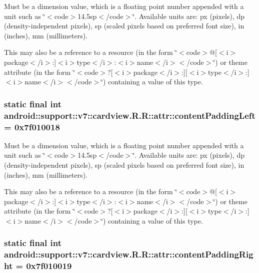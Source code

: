 Must be a dimension value, which is a floating point number appended with a unit such as \char`\"{}$<$code$>$14.5sp$<$/code$>$\char`\"{}. Available units are: px (pixels), dp (density-independent pixels), sp (scaled pixels based on preferred font size), in (inches), mm (millimeters). 

This may also be a reference to a resource (in the form \char`\"{}$<$code$>$@\mbox{[}$<$i$>$package$<$/i$>$:\mbox{]}$<$i$>$type$<$/i$>$:$<$i$>$name$<$/i$>$$<$/code$>$\char`\"{}) or theme attribute (in the form \char`\"{}$<$code$>$?\mbox{[}$<$i$>$package$<$/i$>$:\mbox{]}\mbox{[}$<$i$>$type$<$/i$>$:\mbox{]}$<$i$>$name$<$/i$>$$<$/code$>$\char`\"{}) containing a value of this type. \hypertarget{classandroid_1_1support_1_1v7_1_1cardview_1_1_r_1_1attr_bb0d43620767ddf0f0698491c1278877}{
\subsubsection[{contentPaddingLeft}]{\setlength{\rightskip}{0pt plus 5cm}static final int android::support::v7::cardview.R.R::attr::contentPaddingLeft = 0x7f010018}}
\label{classandroid_1_1support_1_1v7_1_1cardview_1_1_r_1_1attr_bb0d43620767ddf0f0698491c1278877}


Must be a dimension value, which is a floating point number appended with a unit such as \char`\"{}$<$code$>$14.5sp$<$/code$>$\char`\"{}. Available units are: px (pixels), dp (density-independent pixels), sp (scaled pixels based on preferred font size), in (inches), mm (millimeters). 

This may also be a reference to a resource (in the form \char`\"{}$<$code$>$@\mbox{[}$<$i$>$package$<$/i$>$:\mbox{]}$<$i$>$type$<$/i$>$:$<$i$>$name$<$/i$>$$<$/code$>$\char`\"{}) or theme attribute (in the form \char`\"{}$<$code$>$?\mbox{[}$<$i$>$package$<$/i$>$:\mbox{]}\mbox{[}$<$i$>$type$<$/i$>$:\mbox{]}$<$i$>$name$<$/i$>$$<$/code$>$\char`\"{}) containing a value of this type. \hypertarget{classandroid_1_1support_1_1v7_1_1cardview_1_1_r_1_1attr_3578ef1146679345c7a93b29a88d918e}{
\subsubsection[{contentPaddingRight}]{\setlength{\rightskip}{0pt plus 5cm}static final int android::support::v7::cardview.R.R::attr::contentPaddingRight = 0x7f010019}}
\label{classandroid_1_1support_1_1v7_1_1cardview_1_1_r_1_1attr_3578ef1146679345c7a93b29a88d918e}


